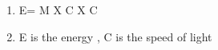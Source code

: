 
\begin{enumerate}
\item E= M X C X C 
\item E is the energy , C is the speed of light 
\end{enumerate}

